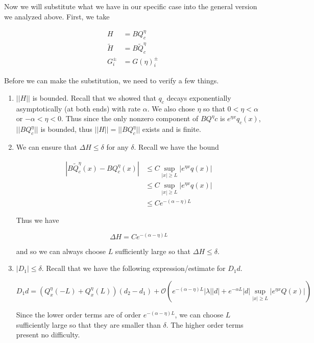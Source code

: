 \documentclass[12pt]{article}
\begin{document}
Now we will substitute what we have in our specific case into the general version we analyzed above. First, we take

\begin{align*}
H &= B Q^\eta_c \\
\tilde{H} &= B \tilde{Q}^\eta_c \\
G_i^\pm &= G(\eta)_i^\pm
\end{align*}

Before we can make the substitution, we need to verify a few things.

\begin{enumerate}

\item $||H||$ is bounded. Recall that we showed that $q_c$ decays exponentially asymptotically (at both ends) with rate $\alpha$. We also chose $\eta$ so that $0 < \eta < \alpha$ or $-\alpha < \eta < 0$. Thus since the only nonzero component of $B Q^\eta c$ is $e^{\eta x} q_c(x)$, $||B Q^\eta_c||$ is bounded, thus $||H|| = ||B Q^\eta_c||$ exists and is finite.\\

\item We can ensure that $\Delta H \leq \delta$ for any $\delta$. Recall we have the bound

\begin{align*}
| B \tilde{Q}^\eta_c(x) - B Q^\eta_c(x) | &\leq C \sup_{|x| \geq L} |e^{\eta x} q(x)| \\
&\leq C \sup_{|x| \geq L} |e^{\eta x} q(x)| \\
&\leq C e^{-(\alpha - \eta)L}
\end{align*}

Thus we have

\[
\Delta H = C e^{-(\alpha - \eta)L}
\]

and so we can always choose $L$ sufficiently large so that $\Delta H \leq \delta$.

\item $|D_1| \leq \delta$. Recall that we have the following expression/estimate for $D_1 d$. 

\[
D_1 d = (Q^\eta_x(-L) + Q^\eta_x(L))(d_2 - d_1) + \mathcal{O}\left(e^{-(\alpha - \eta) L}|\lambda||d| + e^{-\alpha L} |d| \sup_{|x| \geq L} |e^{\eta x} Q(x)| \right) 
\]

Since the lower order terms are of order $e^{-(\alpha - \eta)L}$, we can choose $L$ sufficiently large so that they are smaller than $\delta$. The higher order terms present no difficulty.

\end{enumerate}
\end{document}

